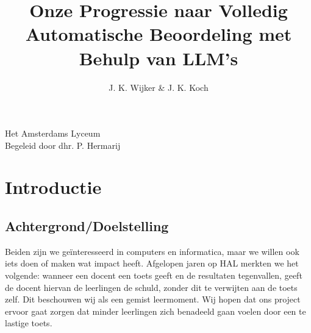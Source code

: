 \documentclass[12pt]{article}
\title{Onze Progressie naar Volledig Automatische Beoordeling met Behulp van LLM's}
\author{J. K. Wijker & J. K. Koch}
\begin{document}
\maketitle
\mbox{}
\vfill
\begin{flushright}
\large Het Amsterdams Lyceum\\
\scriptsize Begeleid door dhr. P. Hermarij \normalsize
\end{flushright}
\thispagestyle{empty}
\pagebreak
\tableofcontents

\pagebreak
\section{Introductie}
\begin{multicols}{2}
\subsection{Achtergrond/Doelstelling} 

Beiden zijn we geïnteresseerd in computers en informatica, maar we willen ook iets doen of maken wat impact heeft. Afgelopen jaren op HAL merkten we het volgende: wanneer een docent een toets geeft en de resultaten tegenvallen, geeft de docent hiervan de leerlingen de schuld, zonder dit te verwijten aan de toets zelf. Dit beschouwen wij als een gemist leermoment. Wij hopen dat ons project ervoor gaat zorgen dat minder leerlingen zich benadeeld gaan voelen door een te lastige toets. 



\end{multicols}
\end{document}
